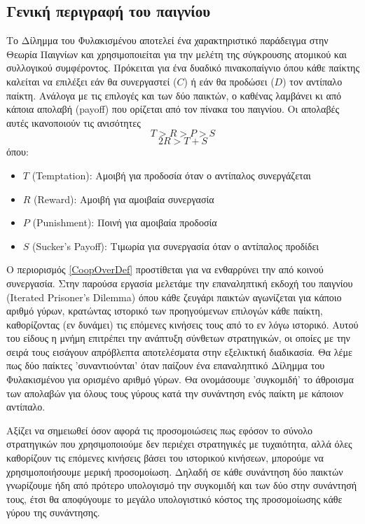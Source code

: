\documentclass[12pt]{report}
\begin{document}
\subsection{Γενική περιγραφή του παιγνίου}
Το Δίλημμα του Φυλακισμένου αποτελεί ένα χαρακτηριστικό παράδειγμα στην Θεωρία Παιγνίων και χρησιμοποιείται για την μελέτη της σύγκρουσης ατομικού και συλλογικού συμφέροντος. Πρόκειται για ένα δυαδικό πινακοπαίγνιο όπου κάθε παίκτης καλείται να επιλέξει εάν θα συνεργαστεί ($C$) ή εάν θα προδώσει ($D$) τον αντίπαλο παίκτη. Ανάλογα με τις επιλογές και των δύο παικτών, ο καθένας λαμβάνει κι από κάποια απολαβή (\foreignlanguage{english}{payoff}) που ορίζεται από τον πίνακα του παιγνίου. Οι απολαβές αυτές ικανοποιούν τις ανισότητες 
\begin{equation}
    T>R>P>S 
\end{equation}
\begin{equation}
    \label{CoopOverDef}
    2R>T+S
\end{equation}
όπου:
\begin{itemize}
    \item $T$ (\foreignlanguage{english}{Temptation}): Αμοιβή για προδοσία όταν ο αντίπαλος συνεργάζεται
    \item $R$ (\foreignlanguage{english}{Reward}): Αμοιβή για αμοιβαία συνεργασία
    \item $P$ (\foreignlanguage{english}{Punishment}): Ποινή για αμοιβαία προδοσία
    \item $S$ (\foreignlanguage{english}{Sucker's Payoff}): Τιμωρία για συνεργασία όταν ο αντίπαλος προδίδει
\end{itemize}
Ο περιορισμός \ref{CoopOverDef} προστίθεται για να ενθαρρύνει την από κοινού συνεργασία.
Στην παρούσα εργασία μελετάμε την επαναληπτική εκδοχή του παιγνίου (\foreignlanguage{english}{Iterated Prisoner's Dilemma}) όπου κάθε ζευγάρι παικτών αγωνίζεται για κάποιο αριθμό γύρων, κρατώντας ιστορικό των προηγούμενων επιλογών κάθε παίκτη, καθορίζοντας (εν δυνάμει) τις επόμενες κινήσεις τους από το εν λόγω ιστορικό. Αυτού του είδους η μνήμη επιτρέπει την ανάπτυξη σύνθετων στρατηγικών, οι οποίες με την σειρά τους εισάγουν απρόβλεπτα αποτελέσματα στην εξελικτική διαδικασία.
Θα λέμε πως δύο παίκτες 'συναντιούνται' όταν παίζουν ένα επαναληπτικό Δίλημμα του Φυλακισμένου για ορισμένο αριθμό γύρων. Θα ονομάσουμε 'συγκομιδή' το άθροισμα των απολαβών για όλους τους γύρους κατά την συνάντηση ενός παίκτη με κάποιον αντίπαλο.

Αξίζει να σημειωθεί όσον αφορά τις προσομοιώσεις πως εφόσον το σύνολο στρατηγικών που χρησιμοποιούμε δεν περιέχει στρατηγικές με τυχαιότητα, αλλά όλες καθορίζουν τις επόμενες κινήσεις βάσει του ιστορικού κινήσεων, μπορούμε να χρησιμοποιήσουμε μερική προσομοίωση. Δηλαδή σε κάθε συνάντηση δύο παικτών γνωρίζουμε ήδη από πρότερο υπολογισμό την συγκομιδή και των δύο στην συνάντησή τους, έτσι θα αποφύγουμε το μεγάλο υπολογιστικό κόστος της προσομοίωσης κάθε γύρου της συνάντησης.
\end{document}
